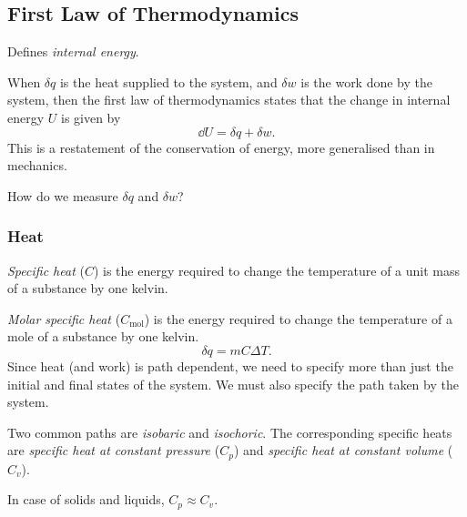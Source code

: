 
\subsection{First Law of Thermodynamics} \label{sec:FLOT}
Defines \emph{internal energy}.

When $\delta q$ is the heat supplied to the system, and $\delta w$ is the work
done by the system, then the first law of thermodynamics states that the change
in internal energy $U$ is given by \[
    \dd U = \delta q + \delta w.
\] This is a restatement of the conservation of energy, more generalised than in
mechanics.

How do we measure $\delta q$ and $\delta w$?

\subsubsection{Heat} \label{sec:heat}
\emph{Specific heat} ($C$) is the energy required to change the temperature of
a unit mass of a substance by one kelvin.

\emph{Molar specific heat} ($C_{\textrm{mol}}$) is the energy required to change
the temperature of a mole of a substance by one kelvin.
\[
    \delta q = m C \Delta T.
\] Since heat (and work) is path dependent, we need to specify more than just
the initial and final states of the system.
We must also specify the path taken by the system.

Two common paths are \emph{isobaric} and \emph{isochoric}.
The corresponding specific heats are \emph{specific heat at constant pressure}
($C_p$) and \emph{specific heat at constant volume} ($C_v$).

In case of solids and liquids, $C_p \approx C_v$.

